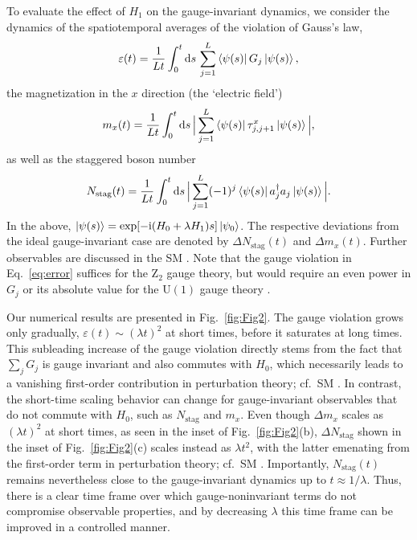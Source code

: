 \documentclass[aps,prl,reprint,twocolumn,superscriptaddress,floatfix,nofootinbib]{revtex4-1}
\def\d{\mathrm d}
\def\d{\mathrm d}
\begin{document}
	To evaluate the effect of $H_1$ on the gauge-invariant dynamics, we consider the dynamics of the spatiotemporal averages of the violation of Gauss's law, 
	\begin{equation}\label{eq:error}
	\varepsilon(t)=\frac{1}{Lt}\int_0^t\d s\, \sum_{j=1}^L\bra{\psi(s)}G_j\ket{\psi(s)},
	\end{equation}
	the magnetization in the $x$ direction (the `electric field')
	\begin{align}\label{eq:mag}
	m_{x}(t)=\frac{1}{Lt}\int_0^t\d s\,\Big|\sum_{j=1}^L\bra{\psi(s)}\tau^{x}_{j,j+1}\ket{\psi(s)}\Big|,
	\end{align} 
	as well as the staggered boson number
	\begin{equation}\label{eq:nstag}
	N_\text{stag}(t)=\frac{1}{Lt}\int_0^t\d s\,\Big| \sum_{j=1}^L(-1)^j\bra{\psi(s)}a_j^\dagger a_j\ket{\psi(s)}\Big|.
	\end{equation}
	In the above, $\ket{\psi(s)}=\exp[-\mathrm{i}(H_0+\lambda H_1)s]\ket{\psi_0}$. 
	The respective deviations from the ideal gauge-invariant case are denoted by $\Delta N_\text{stag}(t)$ and $\Delta m_x(t)$. 
	Further observables are discussed in the SM \cite{SM4}. Note that the gauge violation in Eq.~\eqref{eq:error} suffices for the $\mathrm{Z}_2$ gauge theory, but would require an even power in $G_j$ or its absolute value for the $\mathrm{U}(1)$ gauge theory \cite{SM0}.
	
	
	Our numerical results are presented in Fig.~\ref{fig:Fig2}. 
	The gauge violation grows only gradually, $\varepsilon(t)\sim(\lambda t)^2$ at short times, before it saturates at long times. This subleading increase of the gauge violation directly stems from the fact that $\sum_j G_j$ is gauge invariant and also commutes with $H_0$, which necessarily leads to a vanishing first-order contribution in perturbation theory; cf.~SM \cite{SM1}. 
	In contrast, the short-time scaling behavior can change for gauge-invariant observables that do not commute with $H_0$, such as $N_\text{stag}$ and $m_x$. Even though $\Delta m_x$ scales as $(\lambda t)^2$ at short times, as seen in the inset of Fig.~\ref{fig:Fig2}(b), $\Delta N_\text{stag}$ shown in the inset of Fig.~\ref{fig:Fig2}(c) scales instead as $\lambda t^2$, with the latter emenating from the first-order term in perturbation theory; cf.~SM \cite{SM1}.  
	Importantly, $N_\text{stag}(t)$ remains nevertheless close to the gauge-invariant dynamics up to $t\approx1/\lambda$. 
	Thus, there is a clear time frame over which gauge-noninvariant terms do not compromise observable properties, and by decreasing $\lambda$ this time frame can be improved in a controlled manner.
	
\end{document}
